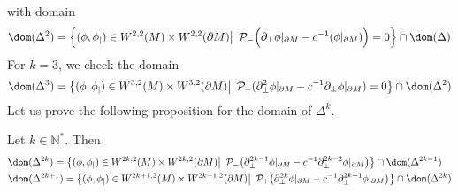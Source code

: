 with domain 
\begin{equation*}
\dom(\Delta^2) = \Big\{ (\phi, \phi_|) \in W^{2,2}(M)\times W^{2,2}(\partial M) \big\vert\enskip \mathcal{P}_- \Big(\partial_\bot\phi\vert_{\partial M} - c^{-1} (\phi\vert_{\partial M}) \Big) = 0 \Big\} \cap \dom(\Delta)
\end{equation*} 
For $k = 3$, 
we check the domain
\begin{equation*}
\dom(\Delta^3) = \big\{ (\phi, \phi_|)\in W^{3,2}(M)\times W^{3,2}(\partial M) \big\vert \enskip \mathcal{P}_+(\partial_\bot^2 \phi\vert_{\partial M} - c^{-1}\partial_\bot \phi\vert_{\partial M} ) = 0 \big\} 
\cap \dom(\Delta^2)
\end{equation*}
Let us prove the following proposition for the domain of $\Delta^k$.
\begin{proposition}
Let $k \in \mathbb{N}^*$. Then
\begin{equation*}
\begin{split}
& \dom (\Delta^{2k} )  =
\big\{ (\phi, \phi_|)\in W^{2k,2}(M)\times W^{2k,2}(\partial M) \big\vert \enskip \mathcal{P}_-\big( \partial_\bot^{2k-1}\phi\vert_{\partial M} - c^{-1}\partial_\bot^{2k-2}\phi\vert_{\partial M}\big) \big\} 
\cap \dom(\Delta^{2k - 1})  \\
& \dom (\Delta^{2k+1} )  =
\big\{ (\phi, \phi_|)\in W^{2k+1,2}(M)\times W^{2k+1,2}(\partial M) \big\vert \enskip \mathcal{P}_+\big( \partial_\bot^{2k}\phi\vert_{\partial M} - c^{-1}\partial_\bot^{2k-1}\phi\vert_{\partial M}\big) \big\}  \cap \dom(\Delta^{2k })
\end{split}
\end{equation*}
\end{proposition}
